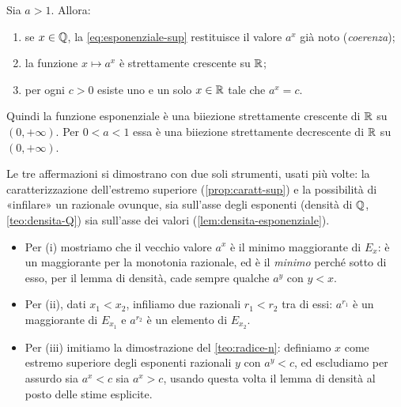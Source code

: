 \begin{teorema}\label{teo:esponenziale}
Sia $a>1$. Allora:
\begin{enumerate}
  \item se $x\in\mathbb{Q}$, la \eqref{eq:esponenziale-sup} restituisce il valore $a^{x}$ già
  noto (\emph{coerenza});
  \item la funzione $x\mapsto a^{x}$ è strettamente crescente su $\mathbb{R}$;
  \item per ogni $c>0$ esiste uno e un solo $x\in\mathbb{R}$ tale che $a^{x}=c$.
\end{enumerate}
Quindi la funzione esponenziale è una biiezione strettamente crescente di $\mathbb{R}$ su
$(0,+\infty)$. Per $0<a<1$ essa è una biiezione strettamente decrescente di $\mathbb{R}$ su
$(0,+\infty)$.
\end{teorema}

\begin{schema}
\end{schema}

\begin{strategia}
Le tre affermazioni si dimostrano con due soli strumenti, usati più volte: la
caratterizzazione dell'estremo superiore (\cref{prop:caratt-sup}) e la possibilità di
«infilare» un razionale ovunque, sia sull'asse degli esponenti (densità di $\mathbb{Q}$,
\cref{teo:densita-Q}) sia sull'asse dei valori (\cref{lem:densita-esponenziale}).
\begin{itemize}
  \item Per (i) mostriamo che il vecchio valore $a^{x}$ è il minimo maggiorante di
  $E_{x}$: è un maggiorante per la monotonia razionale, ed è il \emph{minimo} perché sotto
  di esso, per il lemma di densità, cade sempre qualche $a^{y}$ con $y<x$.
  \item Per (ii), dati $x_{1}<x_{2}$, infiliamo due razionali $r_{1}<r_{2}$ tra di essi:
  $a^{r_{1}}$ è un maggiorante di $E_{x_{1}}$ e $a^{r_{2}}$ è un elemento di $E_{x_{2}}$.
  \item Per (iii) imitiamo la dimostrazione del \cref{teo:radice-n}: definiamo $x$ come
  estremo superiore degli esponenti razionali $y$ con $a^{y}<c$, ed escludiamo per assurdo
  sia $a^{x}<c$ sia $a^{x}>c$, usando questa volta il lemma di densità al posto delle
  stime esplicite.
\end{itemize}
\end{strategia}

